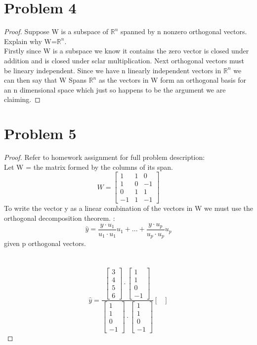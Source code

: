\documentclass[12pt]{article}
\newcommand{\sect}[1]{\section*{#1}}
\newcommand{\R}{\mathbb{R}}
\begin{document}
\sect{Problem 4}
\begin{proof}
  Suppose W is a subspace of $\R^n$ spanned by n nonzero orthogonal vectors.  Explain why W=$\R^n$.\\
  Firstly since W is a subspace we know it contains the zero vector is closed under addition and is closed under sclar multiplication. Next orthogonal vectors must be lineary independent. Since we have n linearly independent vectors in $\R^n$ we can then say that W Spans $\R^n$ as the vectors in W form an orthogonal basis for an n dimensional space which just so happens to be the argument we are claiming.
\end{proof}
\sect{Problem 5}
\begin{proof}
  Refer to homework assignment for full problem description:\\
  Let W = the matrix formed by the columns of its span.
  \[
    W =\begin{bmatrix}
      1&1&0\\1&0&-1\\0&1&1\\-1&1&-1
  \end{bmatrix}
  \]
  To write the vector y as a linear combination of the vectors in W we must use the orthogonal decomposition theorem. :
  \[
   \hat{y}=\frac{y \cdot u_1}{u_1 \cdot u_1}u_1+...+\frac{y \cdot u_p}{u_p \cdot u_p}u_p
  \]
  given p orthogonal vectors.\\\\\\
  \[
    \hat{y}=
    \frac{  \begin{bmatrix}
        3\\4\\5\\6
      \end{bmatrix}\cdot \begin{bmatrix}
        1\\1\\0\\-1
    \end{bmatrix}}{\begin{bmatrix}
      1\\1\\0\\-1
    \end{bmatrix} \cdot \begin{bmatrix}
      1\\1\\0\\-1
    \end{bmatrix}}\begin{bmatrix}

\end{bmatrix}\]
\end{proof}
\end{document}
